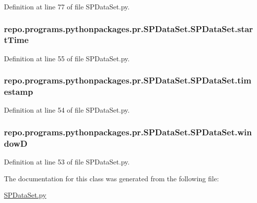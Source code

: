 Definition at line 77 of file S\-P\-Data\-Set.\-py.

\hypertarget{classrepo_1_1programs_1_1pythonpackages_1_1pr_1_1SPDataSet_1_1SPDataSet_a6e2d1324af2938ac6b23d63d9f8a89c7}{
\subsubsection[{start\-Time}]{\setlength{\rightskip}{0pt plus 5cm}repo.\-programs.\-pythonpackages.\-pr.\-S\-P\-Data\-Set.\-S\-P\-Data\-Set.\-start\-Time}}\label{classrepo_1_1programs_1_1pythonpackages_1_1pr_1_1SPDataSet_1_1SPDataSet_a6e2d1324af2938ac6b23d63d9f8a89c7}


Definition at line 55 of file S\-P\-Data\-Set.\-py.

\hypertarget{classrepo_1_1programs_1_1pythonpackages_1_1pr_1_1SPDataSet_1_1SPDataSet_ab6db3c53a18a01fec96f0973c394702a}{
\subsubsection[{timestamp}]{\setlength{\rightskip}{0pt plus 5cm}repo.\-programs.\-pythonpackages.\-pr.\-S\-P\-Data\-Set.\-S\-P\-Data\-Set.\-timestamp}}\label{classrepo_1_1programs_1_1pythonpackages_1_1pr_1_1SPDataSet_1_1SPDataSet_ab6db3c53a18a01fec96f0973c394702a}


Definition at line 54 of file S\-P\-Data\-Set.\-py.

\hypertarget{classrepo_1_1programs_1_1pythonpackages_1_1pr_1_1SPDataSet_1_1SPDataSet_a0792732403840d5f03968b1888fa42d6}{
\subsubsection[{window\-D}]{\setlength{\rightskip}{0pt plus 5cm}repo.\-programs.\-pythonpackages.\-pr.\-S\-P\-Data\-Set.\-S\-P\-Data\-Set.\-window\-D}}\label{classrepo_1_1programs_1_1pythonpackages_1_1pr_1_1SPDataSet_1_1SPDataSet_a0792732403840d5f03968b1888fa42d6}


Definition at line 53 of file S\-P\-Data\-Set.\-py.



The documentation for this class was generated from the following file\-:\begin{DoxyCompactItemize}
\item 
\hyperlink{SPDataSet_8py}{S\-P\-Data\-Set.\-py}\end{DoxyCompactItemize}
